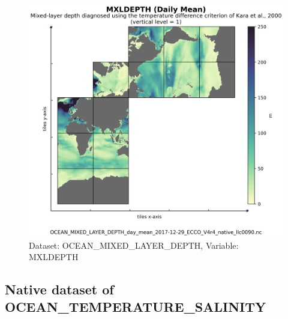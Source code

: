 \begin{figure}[H]
\centering
\includegraphics[scale=0.55]{../images/plots/native_plots/Ocean_Mixed_Layer_Depth/MXLDEPTH.png}
\caption{Dataset: OCEAN\_MIXED\_LAYER\_DEPTH, Variable: MXLDEPTH}
\label{tab:table-OCEAN_MIXED_LAYER_DEPTH_MXLDEPTH-Plot}
\end{figure}
\newpage
\subsection{Native dataset of OCEAN\_TEMPERATURE\_SALINITY}
\newp
